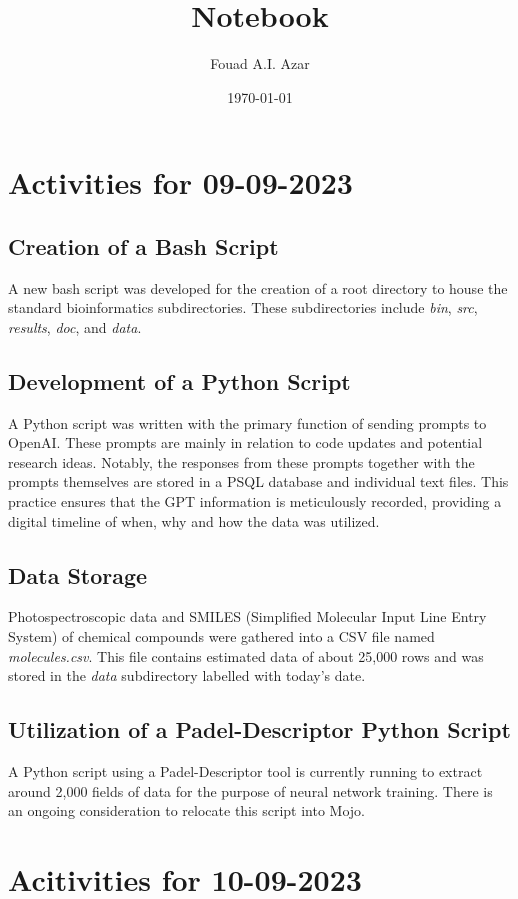 \documentclass{article}
\title{Notebook}
\author{Fouad A.I. Azar}
\date{\today}
\begin{document}
\maketitle

\section*{Activities for 09-09-2023}
\subsection*{Creation of a Bash Script}
A new bash script was developed for the creation of a root directory to house the standard bioinformatics subdirectories. These subdirectories include \textit{bin}, \textit{src}, \textit{results}, \textit{doc}, and \textit{data}.

\subsection*{Development of a Python Script}
A Python script was written with the primary function of sending prompts to OpenAI. These prompts are mainly in relation to code updates and potential research ideas. Notably, the responses from these prompts together with the prompts themselves are stored in a PSQL database and individual text files. This practice ensures that the GPT information is meticulously recorded, providing a digital timeline of when, why and how the data was utilized.

\subsection*{Data Storage}
Photospectroscopic data and SMILES (Simplified Molecular Input Line Entry System) of chemical compounds were gathered into a CSV file named \textit{molecules.csv}. This file contains estimated data of about 25,000 rows and was stored in the \textit{data} subdirectory labelled with today's date.

\subsection*{Utilization of a Padel-Descriptor Python Script}
A Python script using a Padel-Descriptor tool is currently running to extract around 2,000 fields of data for the purpose of neural network training. There is an ongoing consideration to relocate this script into Mojo.

\section*{Acitivities for 10-09-2023}
\end{document}
